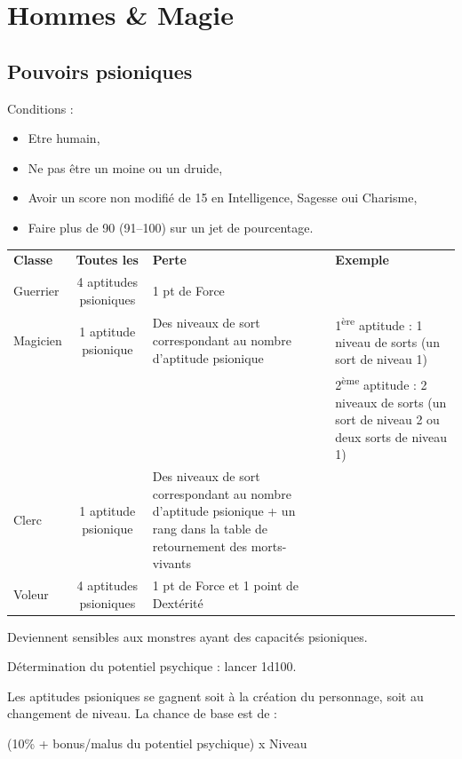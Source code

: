\documentclass[11pt]{article}
\begin{document}
{\newpage
\section*{Hommes \& Magie}

\subsection*{Pouvoirs psioniques}

Conditions :
\begin{itemize}
\item Etre humain,
\item Ne pas être un moine ou un druide,
\item Avoir un score non modifié de 15 en Intelligence, Sagesse oui Charisme,
\item Faire plus de 90 (91--100) sur un jet de pourcentage.

\end{itemize}

\bigskip

\begin{tabular}{lcp{4cm}p{4cm}}
\textbf{Classe} & \textbf{Toutes les} & \textbf{Perte} & \textbf{Exemple}\\
Guerrier & 4 aptitudes psioniques & 1 pt de Force & \\
Magicien & 1 aptitude psionique & Des niveaux de sort correspondant au nombre d'aptitude psionique & 1\textsuperscript{ère} aptitude : 1 niveau de sorts (un sort de niveau 1) \\
&&& 2\textsuperscript{ème} aptitude : 2 niveaux de sorts (un sort de niveau 2 ou deux sorts de niveau 1) \\
Clerc & 1 aptitude psionique & Des niveaux de sort correspondant au nombre d'aptitude psionique + un rang dans la table de retournement des morts-vivants & \\
Voleur & 4 aptitudes psioniques & 1 pt de Force et 1 point de Dextérité & \\
\end{tabular}

Deviennent sensibles aux monstres ayant des capacités psioniques.

Détermination du potentiel psychique : lancer 1d100.

Les aptitudes psioniques se gagnent soit à la création du personnage, soit au changement de niveau. La chance de base est de :

(10\% + bonus/malus du potentiel psychique) x Niveau

}
\end{document}
